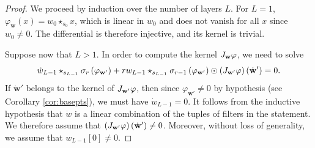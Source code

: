 \documentclass[10pt,a4paper]{amsart}
\newcommand{\conv}[1]{\star_{#1}}
\begin{document}
\begin{proof}
We proceed by induction over the number of layers $L$. For $L=1$,  $\varphi_\mathbf{w}(x) = w_0 \conv{s_0} x$, which is linear in $w_0$ and does not vanish for all $x$ since $w_0 \not = 0$. The differential is therefore injective, and its kernel is trivial. 

Suppose now that $L > 1$. In order to compute the kernel $\textnormal{J}_\mathbf{w} \varphi$, we need to solve
\begin{equation}\label{eq:kerndiff}
   \dot{w}_{L-1} \conv{s_{L-1}} \sigma_r\left(  \varphi_{\mathbf{w}'} \right) + r w_{L-1} \conv{s_{L-1}} \sigma_{r-1}\left(  \varphi_{\mathbf{w}'} \right) \odot \left( \textnormal{J}_\mathbf{w'} \varphi \right)(\dot{\mathbf{w}}') = 0. 
\end{equation}
If $\dot{\mathbf{w}}'$ belongs to the kernel of $\textnormal{J}_\mathbf{w'} \varphi$, then since $\varphi_{\mathbf{w}'} \not = 0$ by hypothesis (see Corollary \ref{cor:basepts}), we must have $\dot{w}_{L-1} = 0$. It follows from the inductive hypothesis that $\dot{w}$ is a linear combination of the tuples of filters in the statement. We therefore assume that $\left( \textnormal{J}_\mathbf{w'} \varphi\right)(\dot{\mathbf{w}}') \not = 0$. Moreover, without loss of generality, we assume that  $w_{L-1}[0] \not = 0$. 


\end{proof}
\end{document}
